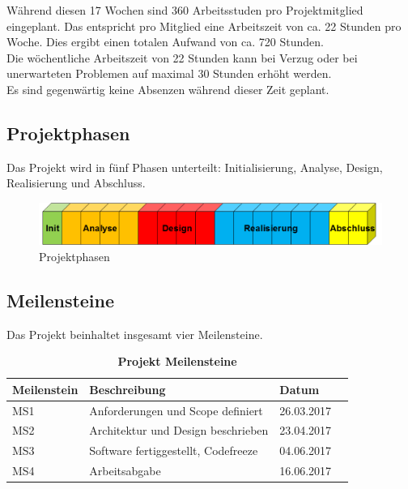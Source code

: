 \noindent Während diesen 17 Wochen sind 360 Arbeitsstuden pro Projektmitglied eingeplant. Das entspricht pro Mitglied eine Arbeitszeit von ca. 22 Stunden pro Woche. Dies ergibt einen totalen Aufwand von ca. 720 Stunden.\\

\noindent Die wöchentliche Arbeitszeit von 22 Stunden kann bei Verzug oder bei unerwarteten Problemen auf maximal 30 Stunden erhöht werden. \\

\noindent Es sind gegenwärtig keine Absenzen während dieser Zeit geplant.

\subsection{Projektphasen}
Das Projekt wird in fünf Phasen unterteilt: Initialisierung, Analyse, Design, Realisierung und Abschluss.
\newline
\begin{figure}[H]
\centering
\includegraphics[width=1\textwidth]{images/phasen.png}
\caption{Projektphasen}
\end{figure}
\subsection{Meilensteine}
Das Projekt beinhaltet insgesamt vier Meilensteine. \\
\begin{table}[H]
    \begin{tabular}{@{} l l l r@{}}\toprule    
    {Meilenstein} & {Beschreibung} & {Datum}\\ \midrule
    MS1 & Anforderungen und Scope definiert  & 26.03.2017\\ \addlinespace
    MS2 & Architektur und Design beschrieben & 23.04.2017\\ \addlinespace
    MS3 & Software fertiggestellt, Codefreeze  & 04.06.2017\\ \addlinespace
    MS4 & Arbeitsabgabe & 16.06.2017\\ 
    \bottomrule
    \end{tabular}
\caption{\textbf{Projekt Meilensteine}}
\end{table}
\newpage
